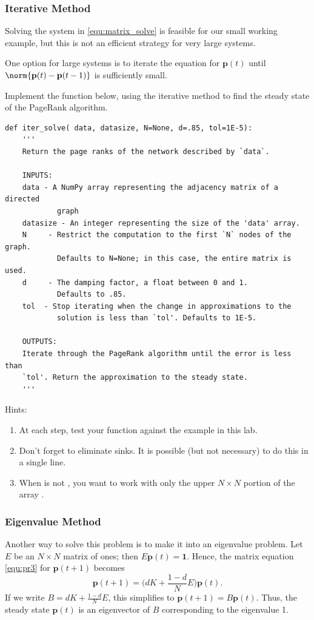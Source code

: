 \subsubsection*{Iterative Method}
Solving the system in \eqref{equ:matrix_solve} is feasible for our small working example, but this is not an efficient strategy for very large systems.

One option for large systems is to iterate the equation for $\mathbf{p}(t)$ until $\norm{\mathbf{p}(t)-\mathbf{p}(t-1)}$ is sufficiently small.


\begin{problem}
\label{prob:pagerank_dense_iter}
Implement the function below, using the iterative method to find the steady state of the PageRank algorithm.
\begin{lstlisting}
def iter_solve( data, datasize, N=None, d=.85, tol=1E-5):
    '''
    Return the page ranks of the network described by `data`.
    
    INPUTS:
    data - A NumPy array representing the adjacency matrix of a directed 
            graph
    datasize - An integer representing the size of the 'data' array.
    N     - Restrict the computation to the first `N` nodes of the graph. 
            Defaults to N=None; in this case, the entire matrix is used.
    d     - The damping factor, a float between 0 and 1. 
            Defaults to .85.
    tol  - Stop iterating when the change in approximations to the 
            solution is less than `tol'. Defaults to 1E-5.
    
    OUTPUTS:
    Iterate through the PageRank algorithm until the error is less than 
    `tol'. Return the approximation to the steady state.
    '''
\end{lstlisting}
Hints:
\begin{enumerate}
\item At each step, test your function against the example in this lab.
\item Don't forget to eliminate sinks. 
It is possible (but not necessary) to do this in a single line.
\item When  is not , you want to work with only the upper $N \times N$ portion of the array .
\end{enumerate}
\end{problem}

\subsubsection*{Eigenvalue Method}
Another way to solve this problem is to make it into an eigenvalue problem. 
Let $E$ be an $N \times N$ matrix of ones; then $E\mathbf{p}(t) = \mathbf{1}$. 
Hence, the matrix equation \eqref{equ:pr3} for $\mathbf{p}(t+1)$ becomes
\[\mathbf{p}(t+1) = \Big(dK + \frac{1-d}{N}E\Big)\mathbf{p}(t).\]
If we write $B = dK + \frac{1-d}{N}E$, this simplifies to $\mathbf{p}(t+1) = B\mathbf{p}(t).$
Thus, the steady state $\mathbf{p}(t)$ is an eigenvector of $B$ corresponding to the eigenvalue 1.

